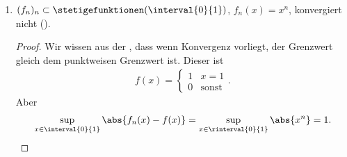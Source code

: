 \begin{beispiele}
\begin{enumerate}
\begin{enumerate}[label=\textbf{\arabic*. Beh}]
\begin{proof}
                
            \end{proof}
            
            \item \( (f_n)_n\subset \stetigefunktionen(\interval{0}{1}) \), \( f_n(x)=x^n \), konvergiert nicht (\vgl {}).
            \begin{proof}
                Wir wissen aus der , dass wenn Konvergenz vorliegt, der Grenzwert gleich dem punktweisen Grenzwert ist. Dieser ist
                \begin{align*}
                    f(x)=\begin{cases}
                        1 & x=1\\
                        0 & \text{sonst}
                    \end{cases}.
                \end{align*}
                Aber
                \begin{align*}
                    \sup_{x\in \interval{0}{1}}\abs{f_n(x)-f(x)}=\sup_{x\in \rinterval{0}{1}}\abs{x^n}=1.
                \end{align*}
            \end{proof}
            

\end{enumerate}
\end{enumerate}
\end{beispiele}
